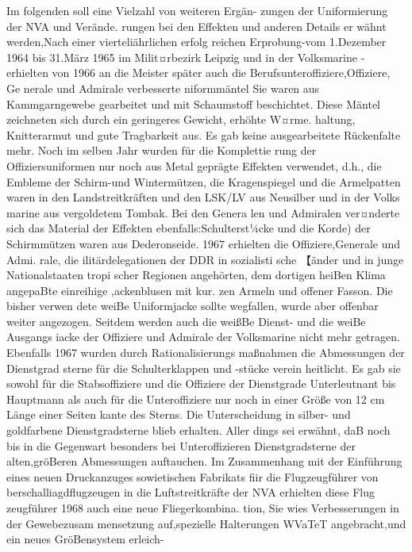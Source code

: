 

Im folgenden soll eine Vielzahl von weiteren Ergän-
zungen der Uniformierung der NVA und Verände.
rungen bei den Effekten und anderen Details er
wähnt werden,Nach einer vierteliährlichen erfolg
reichen Erprobung-vom 1.Dezember 1964 bis
31.März 1965 im Milit¤rbezirk Leipzig und in der
Volksmarine - erhielten von 1966 an die Meister
später auch die Berufsunteroffiziere,Offiziere, Ge
nerale und Admirale verbesserte niformmäntel
Sie waren aus Kammgarngewebe gearbeitet und mit
Schaumstoff beschichtet. Diese Mäntel zeichneten
sich durch ein geringeres Gewicht, erhöhte W¤rme.
haltung, Knitterarmut und gute Tragbarkeit aus. Es
gab keine ausgearbeitete Rückenfalte mehr.
Noch im selben Jahr wurden für die Komplettie
rung der Offiziersuniformen nur noch aus Metal
geprägte Effekten verwendet, d.h., die Embleme der
Schirm-und Wintermützen, die Kragenspiegel und
die Armelpatten waren in den Landstreitkräften
und den LSK/LV aus Neusilber und in der Volks
marine aus vergoldetem Tombak. Bei den Genera
len und Admiralen ver¤nderte sich das Material der
Effekten ebenfalls:Schulterst¼cke und die Korde)
der Schirmmützen waren aus Dederonseide.
1967 erhielten die Offiziere,Generale und Admi.
rale, die ilitärdelegationen der DDR in sozialisti
sche 【änder und in junge Nationalstaaten tropi
scher Regionen angehörten, dem dortigen heiBen
Klima angepaBte einreihige ,ackenblusen mit kur.
zen Armeln und offener Fasson. Die bisher verwen
dete weiBe Uniformjacke sollte wegfallen, wurde
aber offenbar weiter angezogen. Seitdem werden
auch die weißBe Dienst- und die weiBe Ausgangs
iacke der Offiziere und Admirale der Volksmarine
nicht mehr getragen.
Ebenfalls 1967 wurden durch Rationalisierungs
maßnahmen die Abmessungen der Dienstgrad
sterne für die Schulterklappen und -stücke verein
heitlicht. Es gab sie sowohl für die Stabsoffiziere
und die Offiziere der Dienstgrade Unterleutnant bis Hauptmann als auch für die Unteroffiziere nur
noch in einer Größe von 12 cm Länge einer Seiten
kante des Sterns. Die Unterscheidung in silber- und
goldfarbene Dienstgradsterne blieb erhalten. Aller
dings sei erwähnt, daB noch bis in die Gegenwart
besonders bei Unteroffizieren Dienstgradsterne der
alten,gröBeren Abmessungen auftauchen.
Im Zusammenhang mit der Einführung eines
neuen Druckanzuges sowietischen Fabrikats fiir die
Flugzeugführer von berschalliagdflugzeugen in
die Luftstreitkräfte der NVA erhielten diese Flug
zeugführer 1968 auch eine neue Fliegerkombina.
tion, Sie wies Verbesserungen in der Gewebezusam
mensetzung auf,spezielle Halterungen
WVaTeT
angebracht,und ein neues GröBensystem erleich-
